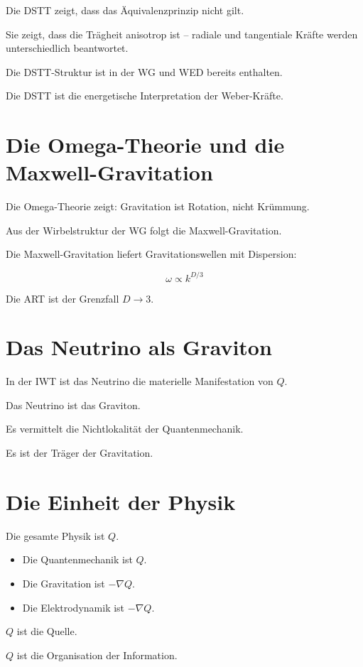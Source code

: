 Die DSTT zeigt, dass das Äquivalenzprinzip nicht gilt.

Sie zeigt, dass die Trägheit anisotrop ist – radiale und tangentiale Kräfte werden unterschiedlich beantwortet.

Die DSTT-Struktur ist in der WG und WED bereits enthalten.

Die DSTT ist die energetische Interpretation der Weber-Kräfte.

\section{Die Omega-Theorie und die Maxwell-Gravitation}

Die Omega-Theorie zeigt: Gravitation ist Rotation, nicht Krümmung.

Aus der Wirbelstruktur der WG folgt die Maxwell-Gravitation.

Die Maxwell-Gravitation liefert Gravitationswellen mit Dispersion:

\[
\omega \propto k^{D/3}
\]

Die ART ist der Grenzfall \( D \to 3 \).

\section{Das Neutrino als Graviton}

In der IWT ist das Neutrino die materielle Manifestation von \( Q \).

Das Neutrino ist das Graviton.

Es vermittelt die Nichtlokalität der Quantenmechanik.

Es ist der Träger der Gravitation.

\section{Die Einheit der Physik}

Die gesamte Physik ist \( Q \).

\begin{itemize}
\item Die Quantenmechanik ist \( Q \).
\item Die Gravitation ist \( -\nabla Q \).
\item Die Elektrodynamik ist \( -\nabla Q \).
\end{itemize}

\( Q \) ist die Quelle.

\( Q \) ist die Organisation der Information.

